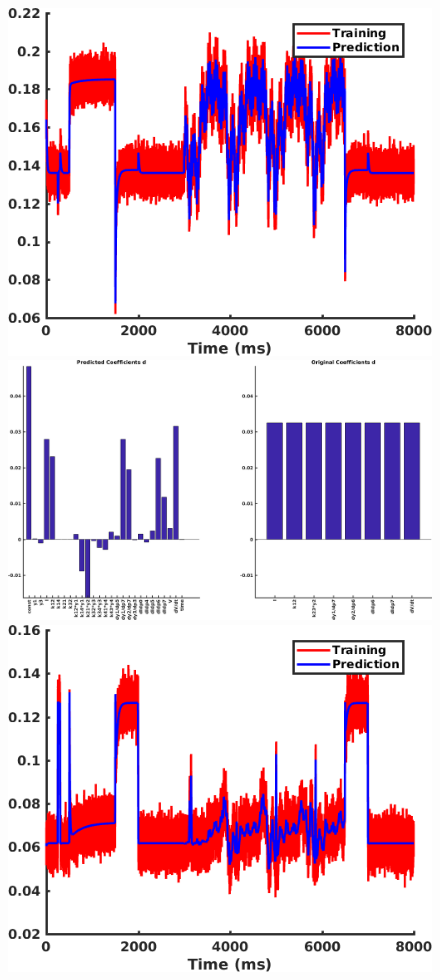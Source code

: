 \documentclass[11pt,a4paper,oneside]{article}
\begin{document}
\begin{figure}[t]
\begin{center}
\includegraphics[scale=0.42]{Figures/LassoArtificialExample1_TrainingVsPrediction.png} \hspace{1cm}
\includegraphics[scale=0.21]{Figures/LassoArtificialExample1_Coeffs.png} \newline \newline
\includegraphics[scale=0.42]{Figures/LassoArtificialExample2_TrainingVsPrediction.png} \hspace{1cm}

\end{center}
\end{figure}
\end{document}
